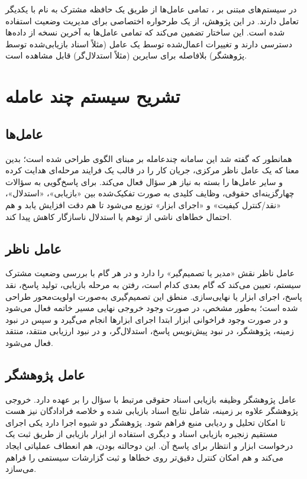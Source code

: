 \documentclass[12pt,a4paper]{report}
\begin{document}
	در سیستم‌های مبتنی بر ، تمامی عامل‌ها از طریق یک حافظه مشترک به نام  با یکدیگر تعامل دارند. در این پژوهش، از یک طرحواره اختصاصی برای مدیریت وضعیت استفاده شده است. این ساختار تضمین می‌کند که تمامی عامل‌ها به آخرین نسخه از داده‌ها دسترسی دارند و تغییرات اعمال‌شده توسط یک عامل (مثلاً اسناد بازیابی‌شده توسط پژوهشگر) بلافاصله برای سایرین (مثلاً استدلال‌گر) قابل مشاهده است.

	\section{تشریح سیستم چند عامله‌}
	
	\subsection{عامل‌ها}
	
	همانطور که گفته شد این سامانه چندعامله بر مبنای الگوی  طراحی شده است؛ بدین معنا که یک عامل ناظر مرکزی، جریان کار را در قالب یک فرایند مرحله‌ای هدایت کرده و سایر عامل‌ها را بسته به نیاز هر سؤال فعال می‌کند. برای پاسخ‌گویی به سؤالات چهارگزینه‌ای حقوقی، وظایف کلیدی به صورت تفکیک‌شده بین «بازیابی»، «استدلال»، «نقد/کنترل کیفیت» و «اجرای ابزار» توزیع می‌شود تا هم دقت افزایش یابد و هم احتمال خطاهای ناشی از توهم یا استدلال ناسازگار کاهش پیدا کند.
	
	\subsection*{عامل ناظر}
	
	عامل ناظر نقش «مدیر یا تصمیم‌گیر» را دارد و در هر گام با بررسی وضعیت مشترک سیستم، تعیین می‌کند که گام بعدی کدام است، رفتن به مرحله بازیابی، تولید پاسخ، نقد پاسخ، اجرای ابزار یا نهایی‌سازی. منطق این تصمیم‌گیری به‌صورت اولویت‌محور طراحی شده است؛ به‌طور مشخص، در صورت وجود خروجی نهایی مسیر خاتمه فعال می‌شود و در صورت وجود فراخوانی ابزار ابتدا اجرای ابزارها انجام می‌گیرد و سپس در نبود زمینه، پژوهشگر، در نبود پیش‌نویس پاسخ، استدلال‌گر، و در نبود ارزیابی منتقد، منتقد فعال می‌شود.
	
	\subsection*{عامل پژوهشگر}
	
	عامل پژوهشگر وظیفه بازیابی اسناد حقوقی مرتبط با سؤال را بر عهده دارد. خروجی پژوهشگر علاوه بر زمینه، شامل نتایج اسناد بازیابی شده و خلاصه فرادادگان نیز هست تا امکان تحلیل و ردیابی منبع فراهم شود. پژوهشگر دو شیوه اجرا دارد یکی اجرای مستقیم زنجیره بازیابی اسناد و دیگری استفاده از ابزار بازیابی از طریق ثبت یک درخواست ابزار و انتظار برای پاسخ آن. این دوحالته بودن، هم انعطاف عملیاتی ایجاد می‌کند و هم امکان کنترل دقیق‌تر روی خطاها و ثبت گزارشات سیستمی را فراهم می‌سازد.
	
\end{document}
